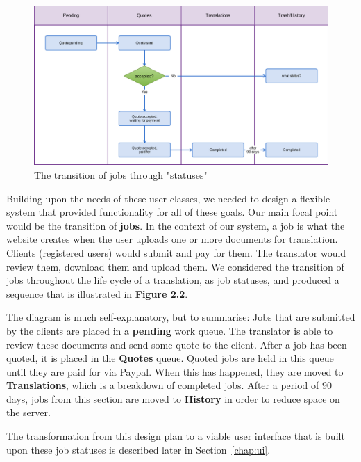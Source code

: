 \documentclass{l3proj}
\begin{document}
\begin{figure}[h]
\centering
\includegraphics[width=\linewidth]{jobstatuses}
\caption{The transition of jobs through "statuses"}
\end{figure}

Building upon the needs of these user classes, we needed to design a flexible system that provided functionality for all of these goals. Our main focal point would be the transition of \textbf{jobs}. In the context of our system, a job is what the website creates when the user uploads one or more documents for translation. Clients (registered users) would submit and pay for them. The translator would review them, download them and upload them. We considered the transition of jobs throughout the life cycle of a translation, as job statuses, and produced a sequence that is illustrated in \textbf{Figure 2.2}. \newline

The diagram is much self-explanatory, but to summarise: Jobs that are submitted by the clients are placed in a \textbf{pending} work queue. The translator is able to review these documents and send some quote to the client. After a job has been quoted, it is placed in the \textbf{Quotes} queue. Quoted jobs are held in this queue until they are paid for via Paypal. When this has happened, they are moved to \textbf{Translations}, which is a breakdown of completed jobs. After a period of 90 days, jobs from this section are moved to \textbf{History} in order to reduce space on the server.

The transformation from this design plan to a viable user interface that is built upon these job statuses is described later in Section~\ref{chap:ui}.
\newline

\newpage

\end{document}
